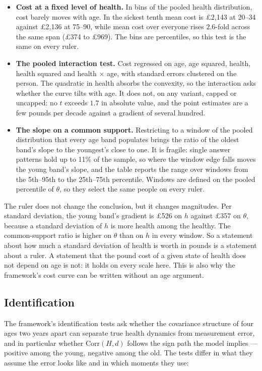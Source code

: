 \documentclass[11pt]{article}
\begin{document}
\begin{itemize}
\item \textbf{Cost at a fixed level of health.} In bins of the pooled health distribution, cost barely moves with age. In the sickest tenth mean cost is \pounds2{,}143 at 20--34 against \pounds2{,}136 at 75--90, while mean cost over everyone rises $2.6$-fold across the same span (\pounds374 to \pounds969). The bins are percentiles, so this test is the same on every ruler.
\item \textbf{The pooled interaction test.} Cost regressed on age, age squared, health, health squared and health $\times$ age, with standard errors clustered on the person. The quadratic in health absorbs the convexity, so the interaction asks whether the curve tilts with age. It does not, on any variant, capped or uncapped: no $t$ exceeds $1.7$ in absolute value, and the point estimates are a few pounds per decade against a gradient of several hundred.
\item \textbf{The slope on a common support.} Restricting to a window of the pooled distribution that every age band populates brings the ratio of the oldest band's slope to the youngest's close to one. It is fragile: single answer patterns hold up to 11\% of the sample, so where the window edge falls moves the young band's slope, and the table reports the range over windows from the 5th--95th to the 25th--75th percentile. Windows are defined on the pooled percentile of $\theta$, so they select the same people on every ruler.
\end{itemize}

The ruler does not change the conclusion, but it changes magnitudes. Per standard deviation, the young band's gradient is \pounds526 on $h$ against \pounds357 on $\theta$, because a standard deviation of $h$ is more health among the healthy. The common-support ratio is higher on $\theta$ than on $h$ in every window. So a statement about how much a standard deviation of health is worth in pounds is a statement about a ruler. A statement that the pound cost of a given state of health does not depend on age is not: it holds on every scale here. This is also why the framework's cost curve can be written without an age argument.

\subsection{Identification}

The framework's identification tests ask whether the covariance structure of
four ages two years apart can separate true health dynamics from measurement
error, and in particular whether $\mathrm{Corr}(H,d)$ follows the sign path the
model implies --- positive among the young, negative among the old. The tests
differ in what they assume the error looks like and in which moments they use:
\end{document}
